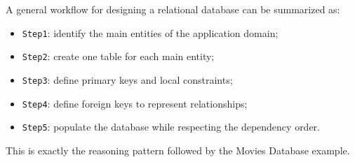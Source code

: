  \begin{example}
  A general workflow for designing a relational database can be summarized as:
  \begin{itemize}
   \item \texttt{Step1}: identify the main entities of the application domain;
   \vspace{0.2cm}
   \item \texttt{Step2}: create one table for each main entity;
   \vspace{0.2cm}
   \item \texttt{Step3}: define primary keys and local constraints;
   \vspace{0.2cm}
   \item \texttt{Step4}: define foreign keys to represent relationships;
   \vspace{0.2cm}
   \item \texttt{Step5}: populate the database while respecting the dependency order.
  \end{itemize}
 \end{example}

 This is exactly the reasoning pattern followed by the Movies Database example.




